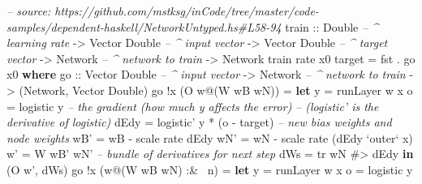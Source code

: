 \documentclass[]{article}
\newenvironment{Shaded}{}{}
\newcommand{\KeywordTok}[1]{\textcolor[rgb]{0.00,0.44,0.13}{\textbf{{#1}}}}
\newcommand{\DataTypeTok}[1]{\textcolor[rgb]{0.56,0.13,0.00}{{#1}}}
\newcommand{\CommentTok}[1]{\textcolor[rgb]{0.38,0.63,0.69}{\textit{{#1}}}}
\newcommand{\OtherTok}[1]{\textcolor[rgb]{0.00,0.44,0.13}{{#1}}}
\newcommand{\FunctionTok}[1]{\textcolor[rgb]{0.02,0.16,0.49}{{#1}}}
\newcommand{\NormalTok}[1]{{#1}}
\begin{document}
\begin{Shaded}
\begin{Highlighting}[]
\CommentTok{-- source: https://github.com/mstksg/inCode/tree/master/code-samples/dependent-haskell/NetworkUntyped.hs#L58-94}
\OtherTok{train ::} \DataTypeTok{Double}           \CommentTok{-- ^ learning rate}
      \OtherTok{->} \DataTypeTok{Vector} \DataTypeTok{Double}    \CommentTok{-- ^ input vector}
      \OtherTok{->} \DataTypeTok{Vector} \DataTypeTok{Double}    \CommentTok{-- ^ target vector}
      \OtherTok{->} \DataTypeTok{Network}          \CommentTok{-- ^ network to train}
      \OtherTok{->} \DataTypeTok{Network}
\NormalTok{train rate x0 target }\FunctionTok{=} \NormalTok{fst }\FunctionTok{.} \NormalTok{go x0}
  \KeywordTok{where}
\OtherTok{    go ::} \DataTypeTok{Vector} \DataTypeTok{Double}    \CommentTok{-- ^ input vector}
       \OtherTok{->} \DataTypeTok{Network}          \CommentTok{-- ^ network to train}
       \OtherTok{->} \NormalTok{(}\DataTypeTok{Network}\NormalTok{, }\DataTypeTok{Vector} \DataTypeTok{Double}\NormalTok{)}
    \NormalTok{go }\FunctionTok{!}\NormalTok{x (}\DataTypeTok{O} \NormalTok{w}\FunctionTok{@}\NormalTok{(}\DataTypeTok{W} \NormalTok{wB wN))}
        \FunctionTok{=} \KeywordTok{let} \NormalTok{y    }\FunctionTok{=} \NormalTok{runLayer w x}
              \NormalTok{o    }\FunctionTok{=} \NormalTok{logistic y}
              \CommentTok{-- the gradient (how much y affects the error)}
              \CommentTok{--   (logistic' is the derivative of logistic)}
              \NormalTok{dEdy }\FunctionTok{=} \NormalTok{logistic' y }\FunctionTok{*} \NormalTok{(o }\FunctionTok{-} \NormalTok{target)}
              \CommentTok{-- new bias weights and node weights}
              \NormalTok{wB'  }\FunctionTok{=} \NormalTok{wB }\FunctionTok{-} \NormalTok{scale rate dEdy}
              \NormalTok{wN'  }\FunctionTok{=} \NormalTok{wN }\FunctionTok{-} \NormalTok{scale rate (dEdy }\OtherTok{`outer`} \NormalTok{x)}
              \NormalTok{w'   }\FunctionTok{=} \DataTypeTok{W} \NormalTok{wB' wN'}
              \CommentTok{-- bundle of derivatives for next step}
              \NormalTok{dWs  }\FunctionTok{=} \NormalTok{tr wN }\FunctionTok{#>} \NormalTok{dEdy}
          \KeywordTok{in}  \NormalTok{(}\DataTypeTok{O} \NormalTok{w', dWs)}
    \NormalTok{go }\FunctionTok{!}\NormalTok{x (w}\FunctionTok{@}\NormalTok{(}\DataTypeTok{W} \NormalTok{wB wN) }\FunctionTok{:&~} \NormalTok{n)}
        \FunctionTok{=} \KeywordTok{let} \NormalTok{y          }\FunctionTok{=} \NormalTok{runLayer w x}
              \NormalTok{o          }\FunctionTok{=} \NormalTok{logistic y}

\end{Highlighting}
\end{Shaded}
\end{document}
